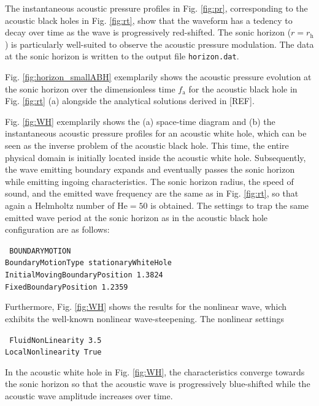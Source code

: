 The instantaneous acoustic pressure profiles in Fig. \ref{fig:pr}, corresponding to the acoustic black holes in Fig. \ref{fig:rt}, show that the waveform has a tedency to decay over time as the wave is progressively red-shifted. The sonic horizon ($r=r_{\mathrm{h}}$) is particularly well-suited to observe the acoustic pressure modulation. The data at the sonic horizon is written to the output file {\tt horizon.dat}.

Fig. \ref{fig:horizon_smallABH} exemplarily shows the acoustic pressure evolution at the sonic horizon over the dimensionless time $f_{\mathrm{a}}$ for the acoustic black hole in Fig. \ref{fig:rt} (a) alongside the analytical solutions derived in [REF].

Fig. \ref{fig:WH} exemplarily shows the (a) space-time diagram and (b) the instantaneous acoustic pressure profiles for an acoustic white hole, which can be seen as the inverse problem of the acoustic black hole. This time, the entire physical domain is initially located inside the acoustic white hole. Subsequently, the wave emitting boundary expands and eventually passes the sonic horizon while emitting ingoing characteristics. The sonic horizon radius, the speed of sound, and the emitted wave frequency are the same as in Fig. \ref{fig:rt}, so that again a Helmholtz number of $\mathrm{He}=50$ is obtained. The settings to trap the same emitted wave period at the sonic horizon as in the acoustic black hole configuration are as follows:

{\tt
BOUNDARYMOTION \\
BoundaryMotionType stationaryWhiteHole \\
InitialMovingBoundaryPosition 1.3824 \\
FixedBoundaryPosition 1.2359
}

Furthermore, Fig. \ref{fig:WH} shows the results for the nonlinear wave, which exhibits the well-known nonlinear wave-steepening. The nonlinear settings

    {\tt
        FluidNonLinearity 3.5 \\
        LocalNonlinearity True
    }

In the acoustic white hole in Fig. \ref{fig:WH}, the characteristics converge towards the sonic horizon so that the acoustic wave is progressively blue-shifted while the acoustic wave amplitude increases over time.


